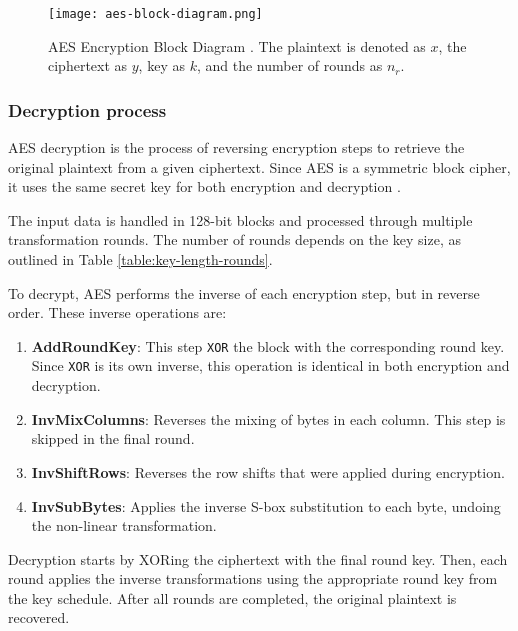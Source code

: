 \begin{figure}[!ht]
    \centering
    \texttt{[image: aes-block-diagram.png]} %
    \caption{
        AES Encryption Block Diagram \cite{Paar2024}.
        The plaintext is denoted as $x$, the ciphertext as $y$, key as $k$, and the number of rounds as $n_r$.
    }
    \label{fig:aes-block-diagram}
\end{figure}


\subsubsection{Decryption process}
\label{sec:decryption}

AES decryption is the process of reversing encryption steps to retrieve the original plaintext from a given ciphertext. 
Since AES is a symmetric block cipher, it uses the same secret key for both encryption and decryption \cite{NIST_AES}.

The input data is handled in 128-bit blocks and processed through multiple transformation rounds. 
The number of rounds depends on the key size, as outlined in Table \ref{table:key-length-rounds}.

To decrypt, AES performs the inverse of each encryption step, but in reverse order. These inverse operations are:

\begin{enumerate}
    \item \textbf{AddRoundKey}: This step \texttt{XOR} the block with the corresponding round key. Since \texttt{XOR} is its own inverse, this operation is identical in both encryption and decryption.
    \item \textbf{InvMixColumns}: Reverses the mixing of bytes in each column. This step is skipped in the final round.
    \item \textbf{InvShiftRows}: Reverses the row shifts that were applied during encryption.
    \item \textbf{InvSubBytes}: Applies the inverse S-box substitution to each byte, undoing the non-linear transformation.
\end{enumerate}

Decryption starts by XORing the ciphertext with the final round key. 
Then, each round applies the inverse transformations using the appropriate round key from the key schedule. 
After all rounds are completed, the original plaintext is recovered.
